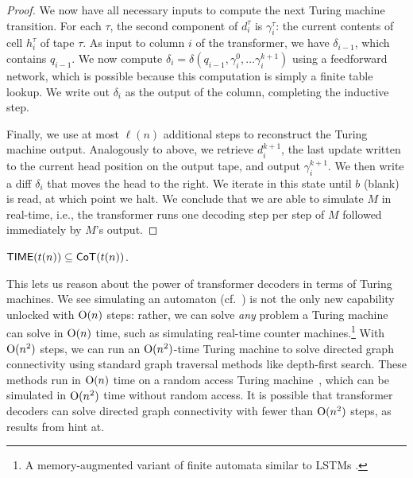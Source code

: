 \begin{proof}
        We now have all necessary inputs to compute the next Turing machine transition.
        For each $\tau$, the second component of $d^\tau_i$ is $\gamma^\tau_i$: the current contents of cell $h^\tau_i$ of tape $\tau$. As input to column $i$ of the transformer, we have $\delta_{i - 1}$, which contains $q_{i-1}$. We now compute
            $\delta_i = \delta(q_{i-1}, \gamma^0_i, \ldots \gamma^{k + 1}_i)$
        using a feedforward network, which is possible because this computation is simply a finite table lookup. We write out $\delta_i$ as the output of the column, completing the inductive step.

    Finally, we use at most $\ell(n)$ additional steps to reconstruct the Turing machine output. Analogously to above, we retrieve $d^{k+1}_i$, the last update written to the current head position on the output tape, and output $\gamma^{k+1}_i$. We then write a diff $\delta_i$ that moves the head to the right. We iterate in this state until $b$ (blank) is read, at which point we halt.
    We conclude that we are able to simulate $M$ in real-time, i.e., the transformer runs one decoding step per step of $M$ followed immediately by $M$'s output.
\end{proof}

\begin{corollary} \label{cor:lower-bound}
    $\mathsf{TIME}(t(n)) \subseteq \mathsf{CoT}(t(n))$.
\end{corollary}
This lets us reason about the power of transformer decoders in terms of Turing machines.
We see simulating an automaton (cf.~) is not the only new capability unlocked with $\mathrm{O}(n)$ steps: rather, we can solve \emph{any} problem a Turing machine can solve in $\mathrm{O}(n)$ time, such as simulating real-time counter machines.\footnote{A memory-augmented variant of finite automata similar to LSTMs \citep{weiss2018practical}.}
With $\mathrm{O}(n^2)$ steps, we can run an $\mathrm{O}(n^2)$-time Turing machine to solve directed graph connectivity using standard graph traversal methods like depth-first search. These methods run in $\mathrm{O}(n)$ time on a random access Turing machine~\citep{wigderson1992complexity}, which can be simulated in $\mathrm{O}(n^2)$ time without random access.
It is possible that transformer decoders can solve directed graph connectivity with fewer than $\mathrm{O}(n^2)$ steps, as results from \citet{zhang2023language} hint at.

